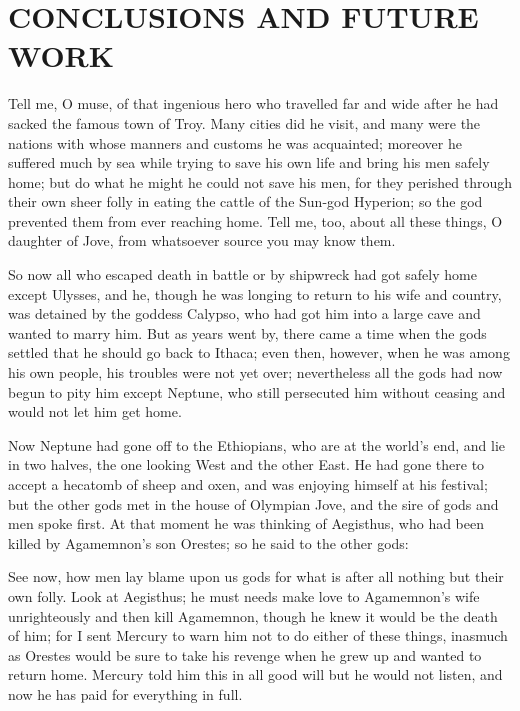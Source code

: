 \chapter{CONCLUSIONS AND FUTURE WORK}
Tell me, O muse, of that ingenious hero who travelled far and wide after he had sacked the famous town of Troy. Many cities did he visit, and many were the nations with whose manners and customs he was acquainted; moreover he suffered much by sea while trying to save his own life and bring his men safely home; but do what he might he could not save his men, for they perished through their own sheer folly in eating the cattle of the Sun-god Hyperion; so the god prevented them from ever reaching home. Tell me, too, about all these things, O daughter of Jove, from whatsoever source you may know them.

So now all who escaped death in battle or by shipwreck had got safely home except Ulysses, and he, though he was longing to return to his wife and country, was detained by the goddess Calypso, who had got him into a large cave and wanted to marry him. But as years went by, there came a time when the gods settled that he should go back to Ithaca; even then, however, when he was among his own people, his troubles were not yet over; nevertheless all the gods had now begun to pity him except Neptune, who still persecuted him without ceasing and would not let him get home.

Now Neptune had gone off to the Ethiopians, who are at the world's end, and lie in two halves, the one looking West and the other East. He had gone there to accept a hecatomb of sheep and oxen, and was enjoying himself at his festival; but the other gods met in the house of Olympian Jove, and the sire of gods and men spoke first. At that moment he was thinking of Aegisthus, who had been killed by Agamemnon's son Orestes; so he said to the other gods:

See now, how men lay blame upon us gods for what is after all nothing but their own folly. Look at Aegisthus; he must needs make love to Agamemnon's wife unrighteously and then kill Agamemnon, though he knew it would be the death of him; for I sent Mercury to warn him not to do either of these things, inasmuch as Orestes would be sure to take his revenge when he grew up and wanted to return home. Mercury told him this in all good will but he would not listen, and now he has paid for everything in full.

